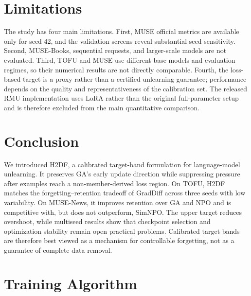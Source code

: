 \documentclass[10pt,twocolumn]{article}
\newcommand{\method}{\textsc{H2DF}}
\begin{document}
\section{Limitations}

The study has four main limitations. First, MUSE official metrics are available
only for seed 42, and the validation screens reveal substantial seed sensitivity.
Second, MUSE-Books, sequential requests, and larger-scale models are not
evaluated. Third, TOFU and MUSE use different base models and evaluation regimes,
so their numerical results are not directly comparable. Fourth, the loss-based
target is a proxy rather than a certified unlearning guarantee; performance
depends on the quality and representativeness of the calibration set. The
released RMU implementation uses LoRA rather than the original full-parameter
setup and is therefore excluded from the main quantitative comparison.

\section{Conclusion}

We introduced \method, a calibrated target-band formulation for language-model
unlearning. It preserves GA's early update direction while suppressing pressure
after examples reach a non-member-derived loss region. On TOFU, \method{} matches
the forgetting--retention tradeoff of GradDiff across three seeds with low
variability. On MUSE-News, it improves retention over GA and NPO and is
competitive with, but does not outperform, SimNPO. The upper target reduces
overshoot, while multiseed results show that checkpoint selection and
optimization stability remain open practical problems. Calibrated target bands
are therefore best viewed as a mechanism for controllable forgetting, not as a
guarantee of complete data removal.
\balance



\onecolumn
\appendix

\section{Training Algorithm}
\label{app:algorithm}
\end{document}
